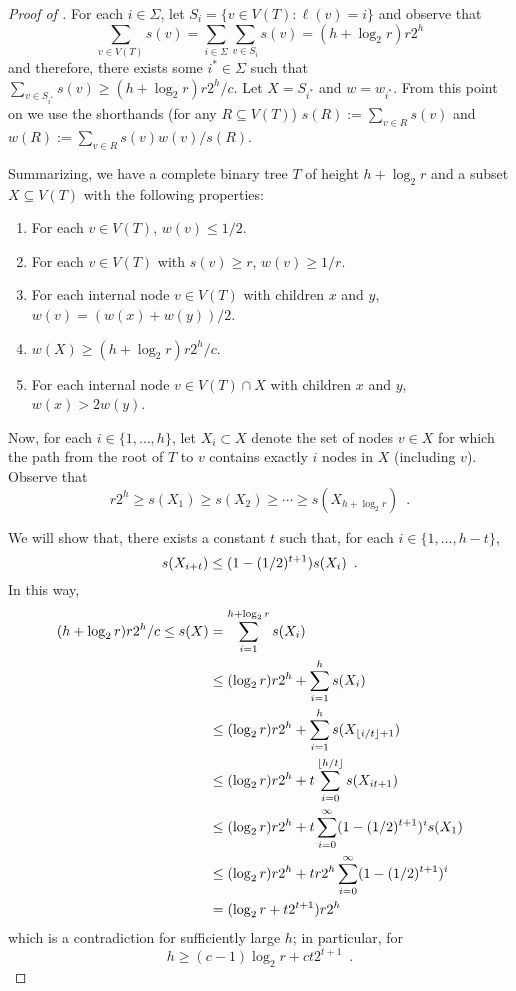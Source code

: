 \documentclass{patmorin}
\begin{document}
\begin{proof}[Proof of ]
  For each $i\in\Sigma$, let $S_i=\{v\in V(T): \ell(v)=i\}$ and observe that 
  \[
      \sum_{v\in V(T)}s(v)=\sum_{i\in\Sigma} \sum_{v\in S_i} s(v) = (h+\log_2 r)r2^{h}
  \]
  and therefore, there exists some $i^*\in\Sigma$ such that
  $\sum_{v\in S_{i^*}}s(v)\ge (h+\log_2 r)r2^h/c$.  Let $X=S_{i^*}$ and $w=w_{i^*}$. From
  this point on we use the shorthands (for any $R\subseteq V(T)$) 
  $s(R):=\sum_{v\in R}s(v)$ and $w(R):=\sum_{v\in R}s(v)w(v)/s(R)$.

  Summarizing, we have a complete binary tree $T$ of height $h+\log_2 r$ and
  a subset $X\subseteq V(T)$ with the following properties: 
  \begin{enumerate}
    \item For each $v\in V(T)$, $w(v) \le 1/2$.
    \item For each $v\in V(T)$ with $s(v) \ge r$, $w(v)\ge 1/r$.
    \item For each internal node $v\in V(T)$ with children $x$ and $y$,
       $w(v) = (w(x)+w(y))/2$.
    \item $w(X) \ge (h+\log_2 r)r2^{h}/c$.
     \item For each internal node $v\in V(T)\cap X$ with children $x$ and $y$,
       $w(x) > 2w(y)$.
  \end{enumerate}
  Now, for each $i\in\{1,\ldots,h\}$, let $X_i\subset X$ denote the
  set of nodes $v\in X$ for which the path from the root of $T$ to $v$
  contains exactly $i$ nodes in $X$ (including $v$).  Observe that 
  \[  r2^h \ge s(X_1) \ge s(X_2) \ge \cdots\ge s(X_{h+\log_2 r}) \enspace . \]

  We will show that, there exists a constant $t$ such that, 
  for each $i\in\{1,\ldots,h-t\}$,  
  \begin{equation}
     s(X_{i+t}) \le (1-(1/2)^{t+1}) s(X_i) \enspace . \eqlabel{t}
  \end{equation}
  In this way, 
  \begin{align*}
     (h+\log_2 r)r2^{h}/c 
        \le s(X) & = \sum_{i=1}^{h+\log_2 r} s(X_i) \\
           &\le (\log_2 r)r2^{h}+\sum_{i=1}^{h} s(X_i) \\
           &\le (\log_2 r)r2^{h}+\sum_{i=1}^{h} s(X_{{\lfloor i/t \rfloor}+1}) \\
           &\le (\log_2 r)r2^{h}+t\sum_{i=0}^{{\lfloor h/t \rfloor}} s(X_{it+1}) \\
           &\le (\log_2 r)r2^{h}+t\sum_{i=0}^{\infty} (1-(1/2)^{t+1})^i s(X_1) \\
           &\le (\log_2 r)r2^{h}+tr2^{h}\sum_{i=0}^{\infty} (1-(1/2)^{t+1})^i  \\
           & = (\log_2 r+t2^{t+1})r2^{h} 
  \end{align*}
  which is a contradiction for sufficiently large $h$; in particular, for 
  \[    
        h \ge (c-1)\log_2 r+ ct2^{t+1} \enspace . 
  \]


\end{proof}
\end{document}

